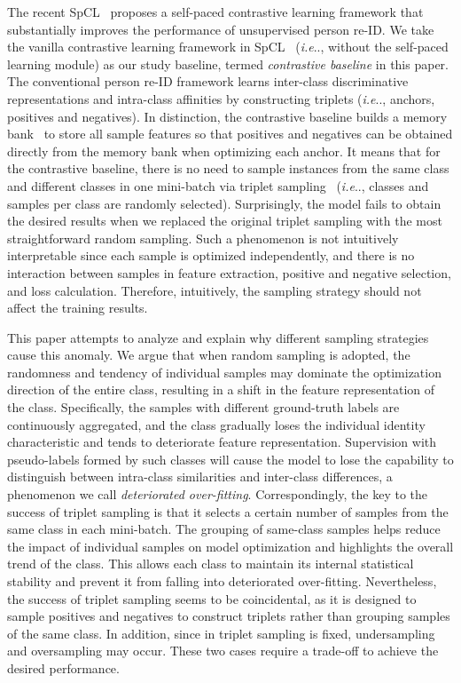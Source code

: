 \documentclass[lettersize,journal]{IEEEtran}
\makeatletter
\DeclareRobustCommand\onedot{\futurelet\@let@token\@onedot}
\def\@onedot{\ifx\@let@token.\else.\null\fi\xspace}
\def\ie{\emph{i.e}\onedot} \def\Ie{\emph{I.e}\onedot}
\makeatother
\begin{document}
The recent SpCL~\cite{SpCL} proposes a self-paced contrastive learning framework that substantially improves the performance of unsupervised person re-ID. We take the vanilla contrastive learning framework in SpCL~\cite{SpCL} (\ie, without the self-paced learning module) as our study baseline, termed \emph{contrastive baseline} in this paper. The conventional person re-ID framework learns inter-class discriminative representations and intra-class affinities by constructing triplets (\ie, anchors, positives and negatives). In distinction, the contrastive baseline builds a memory bank~\cite{memorybank} to store all sample features so that positives and negatives can be obtained directly from the memory bank when optimizing each anchor. It means that for the contrastive baseline, there is no need to sample instances from the same class and different classes in one mini-batch via triplet sampling~\cite{triplet1,triplet} (\ie,  classes and  samples per class are randomly selected). 
Surprisingly, the model fails to obtain the desired results when we replaced the original triplet sampling with the most straightforward random sampling.
Such a phenomenon is not intuitively interpretable since each sample is optimized independently, and there is no interaction between samples in feature extraction, positive and negative selection, and loss calculation. Therefore, intuitively, the sampling strategy should not affect the training results.

\IEEEpubidadjcol

This paper attempts to analyze and explain why different sampling strategies cause this anomaly. We argue that when random sampling is adopted, the randomness and tendency of individual samples may dominate the optimization direction of the entire class, resulting in a shift in the feature representation of the class. 
Specifically, the samples with different ground-truth labels are continuously aggregated, and the class gradually loses the individual identity characteristic and tends to deteriorate feature representation.
Supervision with pseudo-labels formed by such classes will cause the model to lose the capability to distinguish between intra-class similarities and inter-class differences, a phenomenon we call \emph{deteriorated over-fitting}.
Correspondingly, the key to the success of triplet sampling is that it selects a certain number of samples from the same class in each mini-batch. The grouping of same-class samples helps reduce the impact of individual samples on model optimization and highlights the overall trend of the class. This allows each class to maintain its internal statistical stability and prevent it from falling into deteriorated over-fitting. Nevertheless, the success of triplet sampling seems to be coincidental, as it is designed to sample positives and negatives to construct triplets rather than grouping samples of the same class. 
In addition, since  in triplet sampling is fixed, undersampling and oversampling may occur. These two cases require a trade-off to achieve the desired performance.
\end{document}
